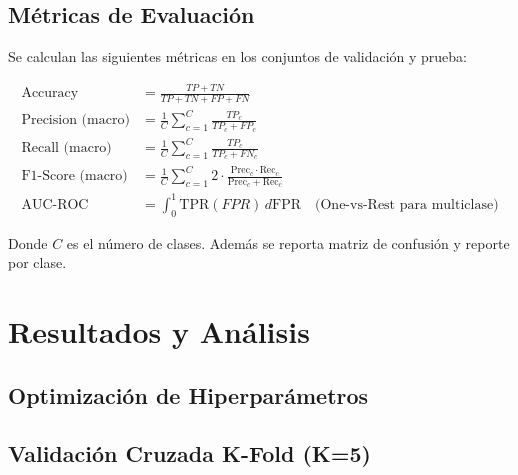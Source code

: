 \documentclass[12pt,a4paper]{article}
\begin{document}
\subsection{Métricas de Evaluación}

Se calculan las siguientes métricas en los conjuntos de validación y prueba:

\begin{align*}
\text{Accuracy} &= \frac{TP + TN}{TP + TN + FP + FN} \\
\text{Precision (macro)} &= \frac{1}{C}\sum_{c=1}^{C} \frac{TP_c}{TP_c + FP_c} \\
\text{Recall (macro)} &= \frac{1}{C}\sum_{c=1}^{C} \frac{TP_c}{TP_c + FN_c} \\
\text{F1-Score (macro)} &= \frac{1}{C}\sum_{c=1}^{C} 2\cdot\frac{\text{Prec}_c \cdot \text{Rec}_c}{\text{Prec}_c + \text{Rec}_c} \\
\text{AUC-ROC} &= \int_0^1 \text{TPR}(FPR) \, d\text{FPR} \quad \text{(One-vs-Rest para multiclase)}
\end{align*}

Donde $C$ es el número de clases. Además se reporta matriz de confusión y reporte por clase.

\section{Resultados y Análisis}
\label{sec:resultados}

\subsection{Optimización de Hiperparámetros}
\subsection{Validación Cruzada K-Fold (K=5)}
\end{document}
